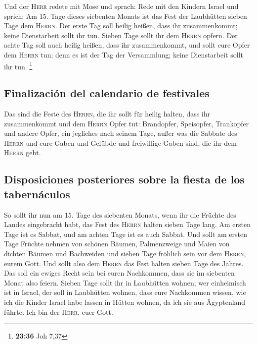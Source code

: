  Und der \textsc{Herr} redete mit Mose und sprach:
 Rede mit den Kindern Israel und sprich: Am 15. Tage
dieses siebenten Monats ist das Fest der Laubhütten sieben Tage dem
\textsc{Herrn}.  Der erste Tag soll heilig heißen, dass
ihr zusammenkommt; keine Dienstarbeit sollt ihr tun. 
Sieben Tage sollt ihr dem \textsc{Herrn} opfern. Der achte Tag soll auch
heilig heißen, dass ihr zusammenkommt, und sollt eure Opfer dem
\textsc{Herrn} tun; denn es ist der Tag der Versammlung; keine
Dienstarbeit sollt ihr tun. \footnote{\textbf{23:36} Joh 7,37}

\hypertarget{finalizaciuxf3n-del-calendario-de-festivales}{%
\subsection{Finalización del calendario de
festivales}\label{finalizaciuxf3n-del-calendario-de-festivales}}

 Das sind die Feste des \textsc{Herrn}, die ihr sollt für
heilig halten, dass ihr zusammenkommt und dem \textsc{Herrn} Opfer tut:
Brandopfer, Speisopfer, Trankopfer und andere Opfer, ein jegliches nach
seinem Tage,  außer was die Sabbate des \textsc{Herrn}
und eure Gaben und Gelübde und freiwillige Gaben sind, die ihr dem
\textsc{Herrn} gebt.

\hypertarget{disposiciones-posteriores-sobre-la-fiesta-de-los-tabernuxe1culos}{%
\subsection{Disposiciones posteriores sobre la fiesta de los
tabernáculos}\label{disposiciones-posteriores-sobre-la-fiesta-de-los-tabernuxe1culos}}

 So sollt ihr nun am 15. Tage des siebenten Monats, wenn
ihr die Früchte des Landes eingebracht habt, das Fest des \textsc{Herrn}
halten sieben Tage lang. Am ersten Tage ist es Sabbat, und am achten
Tage ist es auch Sabbat.  Und sollt am ersten Tage
Früchte nehmen von schönen Bäumen, Palmenzweige und Maien von dichten
Bäumen und Bachweiden und sieben Tage fröhlich sein vor dem
\textsc{Herrn}, eurem Gott.  Und sollt also dem
\textsc{Herrn} das Fest halten sieben Tage des Jahres. Das soll ein
ewiges Recht sein bei euren Nachkommen, dass sie im siebenten Monat also
feiern.  Sieben Tage sollt ihr in Laubhütten wohnen; wer
einheimisch ist in Israel, der soll in Laubhütten wohnen,
 dass eure Nachkommen wissen, wie ich die Kinder Israel
habe lassen in Hütten wohnen, da ich sie aus Ägyptenland führte. Ich bin
der \textsc{Herr}, euer Gott.

